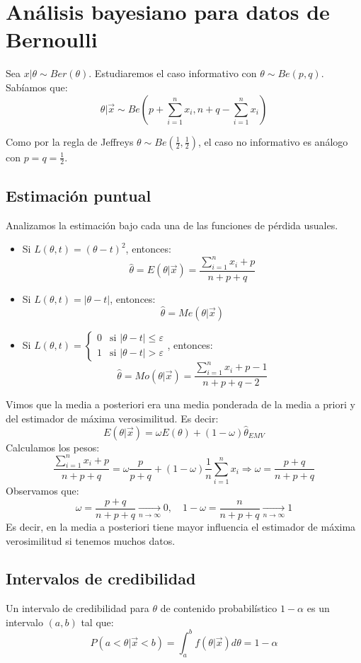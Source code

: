 \section{Análisis bayesiano para datos de Bernoulli}
Sea $x|\theta \sim Ber(\theta)$.
Estudiaremos el caso informativo con $\theta \sim Be(p, q)$.
Sabíamos que:
$$\theta|\vec{x} \sim Be\left(p+\sum_{i=1}^n x_i, n+q-\sum_{i=1}^n x_i\right)$$

Como por la regla de Jeffreys $\theta \sim Be\left(\frac{1}{2}, \frac{1}{2}\right)$, el caso no informativo es análogo con $p = q = \frac{1}{2}$.

\subsection*{Estimación puntual}
Analizamos la estimación bajo cada una de las funciones de pérdida usuales.
\begin{itemize}
    \item Si $L(\theta, t) = (\theta-t)^2$, entonces:
          $$\hat{\theta} = E(\theta|\vec{x}) = \frac{\sum_{i=1}^n x_i + p}{n+p+q}$$
    \item Si $L(\theta, t) = |\theta-t|$, entonces:
          $$\hat{\theta} = Me(\theta|\vec{x})$$
    \item Si $L(\theta, t) = \begin{cases}
                  0 & \text{si } |\theta-t| \leq \varepsilon \\
                  1 & \text{si } |\theta-t| > \varepsilon
              \end{cases}$, entonces:
          $$\hat{\theta} = Mo(\theta|\vec{x}) = \frac{\sum_{i=1}^n x_i + p-1}{n+p+q-2}$$
\end{itemize}

Vimos que la media a posteriori era una media ponderada de la media a priori y del estimador de máxima verosimilitud.
Es decir:
$$E(\theta|\vec{x}) = \omega E(\theta) + (1-\omega)\hat{\theta}_{EMV}$$
Calculamos los pesos:
$$\frac{\sum_{i=1}^n x_i + p}{n+p+q} = \omega\frac{p}{p+q} + (1-\omega)\frac{1}{n}\sum_{i=1}^n x_i \Rightarrow \omega = \frac{p+q}{n+p+q}$$
Observamos que:
$$\omega = \frac{p+q}{n+p+q} \xrightarrow[n \to \infty]{} 0,  \quad 1-\omega = \frac{n}{n+p+q} \xrightarrow[n \to \infty]{} 1$$
Es decir, en la media a posteriori tiene mayor influencia el estimador de máxima verosimilitud si tenemos muchos datos.

\subsection*{Intervalos de credibilidad}
Un intervalo de credibilidad para $\theta$ de contenido probabilístico $1-\alpha$ es un intervalo $(a, b)$ tal que:
$$P(a < \theta|\vec{x} < b) = \int_a^b f(\theta|\vec{x})d\theta = 1-\alpha$$

